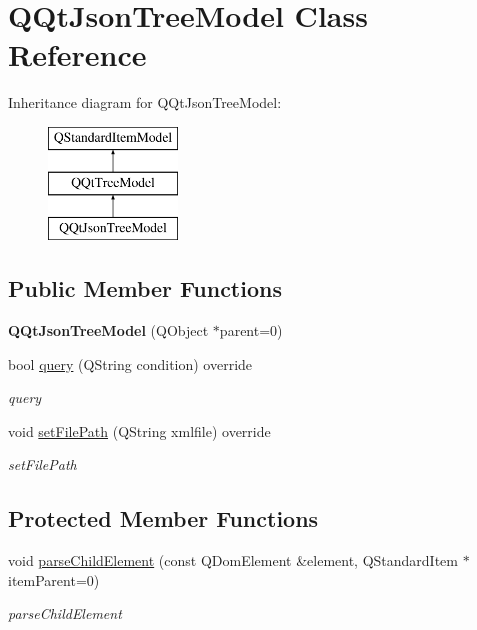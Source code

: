 \hypertarget{class_q_qt_json_tree_model}{}\section{Q\+Qt\+Json\+Tree\+Model Class Reference}
\label{class_q_qt_json_tree_model}
Inheritance diagram for Q\+Qt\+Json\+Tree\+Model\+:\begin{figure}[H]
\begin{center}
\leavevmode
\includegraphics[height=3.000000cm]{class_q_qt_json_tree_model}
\end{center}
\end{figure}
\subsection*{Public Member Functions}
\begin{DoxyCompactItemize}
\item 
\mbox{\label{class_q_qt_json_tree_model_a7e0e021a7459e3349e76fdd53791d6ab}} 
{\bfseries Q\+Qt\+Json\+Tree\+Model} (Q\+Object $\ast$parent=0)
\item 
bool \mbox{\hyperlink{class_q_qt_json_tree_model_a9a26861ebe5884c4c35acd8421f51ed7}{query}} (Q\+String condition) override
\begin{DoxyCompactList}\small\item\em query \end{DoxyCompactList}\item 
void \mbox{\hyperlink{class_q_qt_json_tree_model_a5fe67b3b54a3f8c067fdb9ccdb84e553}{set\+File\+Path}} (Q\+String xmlfile) override
\begin{DoxyCompactList}\small\item\em set\+File\+Path \end{DoxyCompactList}\end{DoxyCompactItemize}
\subsection*{Protected Member Functions}
\begin{DoxyCompactItemize}
\item 
void \mbox{\hyperlink{class_q_qt_json_tree_model_ad7068ddf98be2ac2a2c9ae1a11bb1444}{parse\+Child\+Element}} (const Q\+Dom\+Element \&element, Q\+Standard\+Item $\ast$item\+Parent=0)
\begin{DoxyCompactList}\small\item\em parse\+Child\+Element \end{DoxyCompactList}\end{DoxyCompactItemize}


